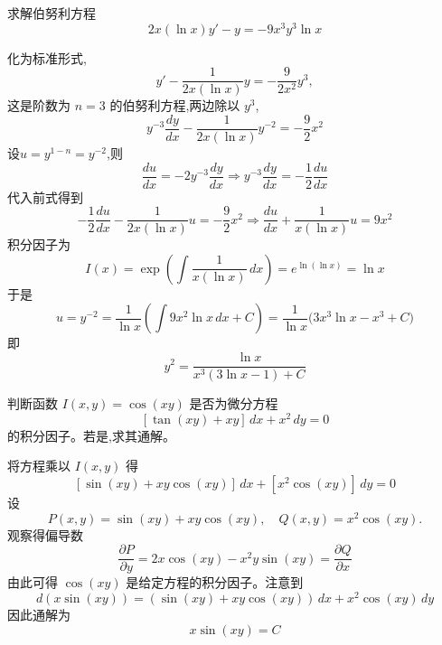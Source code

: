 \begin{questions}
    \question 求解伯努利方程
    \[
    2x(\ln x)y' - y = -9x^{3}y^{3}\ln x
    \]
    \begin{solution}
        化为标准形式,
        \[
        y' - \frac{1}{2x(\ln x)}y = -\frac{9}{2x^2}y^{3},
        \]
        这是阶数为 $n=3$ 的伯努利方程,两边除以 $y^{3}$,
        \[
        y^{-3}\frac{dy}{dx} - \frac{1}{2x(\ln x)}y^{-2} = -\frac{9}{2}x^{2}
        \]
        设$u = y^{1-n} = y^{-2}$,则
        \[
        \frac{du}{dx} = -2y^{-3}\frac{dy}{dx} \Rightarrow
        y^{-3}\frac{dy}{dx} = -\frac{1}{2}\frac{du}{dx}
        \]
        代入前式得到
        \[
        -\frac{1}{2}\frac{du}{dx} - \frac{1}{2x(\ln x)}u = -\frac{9}{2}x^{2} \Rightarrow \frac{du}{dx} + \frac{1}{x(\ln x)}u = 9x^{2} 
        \]
        积分因子为
        \[
        I(x)=\exp{\left(\int \frac{1}{x(\ln x)}\,dx\right)} = e^{\ln(\ln x)} = \ln x
        \]
        于是
        \[
        u = y^{-2} = \frac{1}{\ln x}\left(\int 9x^{2}\ln x\, dx + C\right) = \frac{1}{\ln x}\bigl(3x^{3}\ln x - x^{3} + C \bigr)
        \]
        即
        \[
        y^{2} = \frac{\ln x}{x^{3}(3\ln x - 1) + C}
        \]
    \end{solution}

    \question 判断函数 $I(x, y) = \cos(xy)$ 是否为微分方程
    \[
    [\tan(xy) + xy]\,dx + x^2\,dy = 0
    \]
    的积分因子。若是,求其通解。
    \begin{solution}
        将方程乘以 $I(x, y)$ 得
        \[
        [\sin(xy) + xy\cos(xy)]\,dx + [x^2\cos(xy)]\,dy = 0
        \]
        设
        \[
        P(x,y) = \sin(xy) + xy\cos(xy),\quad Q(x,y) = x^2\cos(xy).
        \]
        观察得偏导数
        \[
        \frac{\partial P}{\partial y} = 2x\cos(xy) - x^2 y \sin(xy) = \frac{\partial Q}{\partial x}
        \]
        由此可得 $\cos(xy)$ 是给定方程的积分因子。注意到
        \[
        d(x\sin(xy)) = (\sin(xy) + xy \cos(xy))\,dx + x^2 \cos(xy)\,dy
        \]
        因此通解为
        \[
        x\sin(xy) = C
        \]
    \end{solution}


\end{questions}

